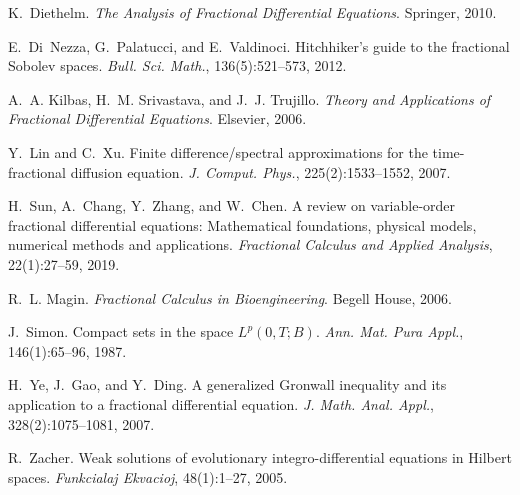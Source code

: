 \documentclass[12pt]{article}
\begin{document}
\begin{thebibliography}{99}

K.~Diethelm.
\newblock \emph{The Analysis of Fractional Differential Equations}.
\newblock Springer, 2010.

E.~Di~Nezza, G.~Palatucci, and E.~Valdinoci.
\newblock Hitchhiker's guide to the fractional {S}obolev spaces.
\newblock \emph{Bull. Sci. Math.}, 136(5):521--573, 2012.

A.~A. Kilbas, H.~M. Srivastava, and J.~J. Trujillo.
\newblock \emph{Theory and Applications of Fractional Differential Equations}.
\newblock Elsevier, 2006.

Y.~Lin and C.~Xu.
\newblock Finite difference/spectral approximations for the time-fractional diffusion equation.
\newblock \emph{J. Comput. Phys.}, 225(2):1533--1552, 2007.

H.~Sun, A.~Chang, Y.~Zhang, and W.~Chen.
\newblock A review on variable-order fractional differential equations: Mathematical foundations, physical models, numerical methods and applications.
\newblock \emph{Fractional Calculus and Applied Analysis}, 22(1):27--59, 2019.

R.~L. Magin.
\newblock \emph{Fractional Calculus in Bioengineering}.
\newblock Begell House, 2006.

J.~Simon.
\newblock Compact sets in the space {$L^p(0,T;B)$}.
\newblock \emph{Ann. Mat. Pura Appl.}, 146(1):65--96, 1987.

H.~Ye, J.~Gao, and Y.~Ding.
\newblock A generalized {G}ronwall inequality and its application to a fractional differential equation.
\newblock \emph{J. Math. Anal. Appl.}, 328(2):1075--1081, 2007.

R.~Zacher.
\newblock Weak solutions of evolutionary integro-differential equations in Hilbert spaces.
\newblock \emph{Funkcialaj Ekvacioj}, 48(1):1--27, 2005.


\end{thebibliography}
\end{document}
